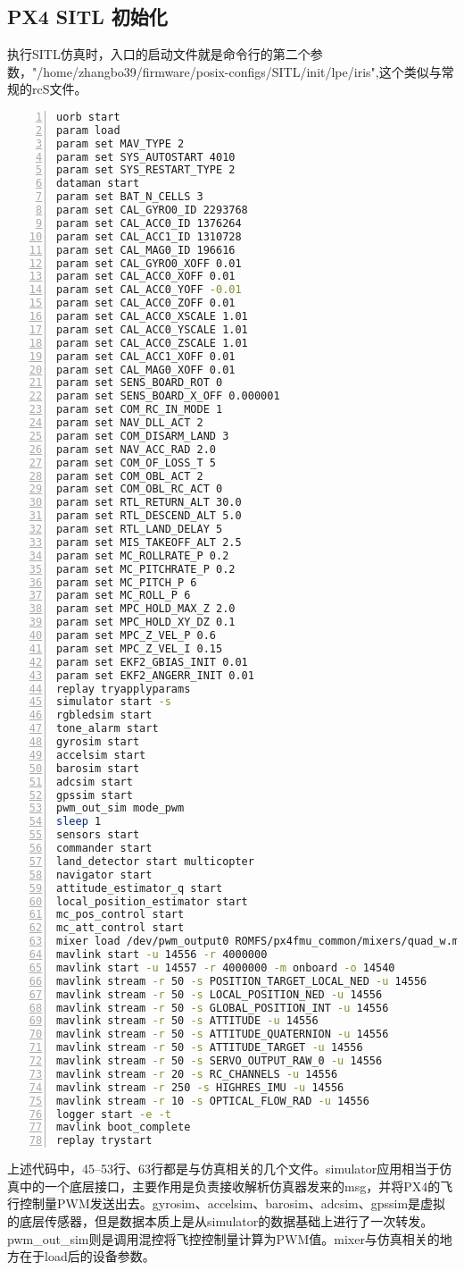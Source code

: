 \subsection{PX4 SITL 初始化}
执行SITL仿真时，入口的启动文件就是命令行的第二个参数，"/home/zhangbo39/firmware/posix-configs/SITL/init/lpe/iris",这个类似与常规的rcS文件。
\begin{lstlisting}[language=bash,numbers=left,firstnumber = 1,breaklines = true,numberstyle=\tiny,keywordstyle=\color{blue!70},commentstyle=\color{red!50!green!50!blue!50},frame=shadowbox, rulesepcolor=\color{red!20!green!20!blue!20}]
uorb start
param load
param set MAV_TYPE 2
param set SYS_AUTOSTART 4010
param set SYS_RESTART_TYPE 2
dataman start
param set BAT_N_CELLS 3
param set CAL_GYRO0_ID 2293768
param set CAL_ACC0_ID 1376264
param set CAL_ACC1_ID 1310728
param set CAL_MAG0_ID 196616
param set CAL_GYRO0_XOFF 0.01
param set CAL_ACC0_XOFF 0.01
param set CAL_ACC0_YOFF -0.01
param set CAL_ACC0_ZOFF 0.01
param set CAL_ACC0_XSCALE 1.01
param set CAL_ACC0_YSCALE 1.01
param set CAL_ACC0_ZSCALE 1.01
param set CAL_ACC1_XOFF 0.01
param set CAL_MAG0_XOFF 0.01
param set SENS_BOARD_ROT 0
param set SENS_BOARD_X_OFF 0.000001
param set COM_RC_IN_MODE 1
param set NAV_DLL_ACT 2
param set COM_DISARM_LAND 3
param set NAV_ACC_RAD 2.0
param set COM_OF_LOSS_T 5
param set COM_OBL_ACT 2
param set COM_OBL_RC_ACT 0
param set RTL_RETURN_ALT 30.0
param set RTL_DESCEND_ALT 5.0
param set RTL_LAND_DELAY 5
param set MIS_TAKEOFF_ALT 2.5
param set MC_ROLLRATE_P 0.2
param set MC_PITCHRATE_P 0.2
param set MC_PITCH_P 6
param set MC_ROLL_P 6
param set MPC_HOLD_MAX_Z 2.0
param set MPC_HOLD_XY_DZ 0.1
param set MPC_Z_VEL_P 0.6
param set MPC_Z_VEL_I 0.15
param set EKF2_GBIAS_INIT 0.01
param set EKF2_ANGERR_INIT 0.01
replay tryapplyparams
simulator start -s
rgbledsim start
tone_alarm start
gyrosim start
accelsim start
barosim start
adcsim start
gpssim start
pwm_out_sim mode_pwm
sleep 1
sensors start
commander start
land_detector start multicopter
navigator start
attitude_estimator_q start
local_position_estimator start
mc_pos_control start
mc_att_control start
mixer load /dev/pwm_output0 ROMFS/px4fmu_common/mixers/quad_w.main.mix
mavlink start -u 14556 -r 4000000
mavlink start -u 14557 -r 4000000 -m onboard -o 14540
mavlink stream -r 50 -s POSITION_TARGET_LOCAL_NED -u 14556
mavlink stream -r 50 -s LOCAL_POSITION_NED -u 14556
mavlink stream -r 50 -s GLOBAL_POSITION_INT -u 14556
mavlink stream -r 50 -s ATTITUDE -u 14556
mavlink stream -r 50 -s ATTITUDE_QUATERNION -u 14556
mavlink stream -r 50 -s ATTITUDE_TARGET -u 14556
mavlink stream -r 50 -s SERVO_OUTPUT_RAW_0 -u 14556
mavlink stream -r 20 -s RC_CHANNELS -u 14556
mavlink stream -r 250 -s HIGHRES_IMU -u 14556
mavlink stream -r 10 -s OPTICAL_FLOW_RAD -u 14556
logger start -e -t
mavlink boot_complete
replay trystart
\end{lstlisting}
上述代码中，45--53行、63行都是与仿真相关的几个文件。simulator应用相当于仿真中的一个底层接口，主要作用是负责接收解析仿真器发来的msg，并将PX4的飞行控制量PWM发送出去。gyrosim、accelsim、barosim、adcsim、gpssim是虚拟的底层传感器，但是数据本质上是从simulator的数据基础上进行了一次转发。pwm_out_sim则是调用混控将飞控控制量计算为PWM值。mixer与仿真相关的地方在于load后的设备参数。


